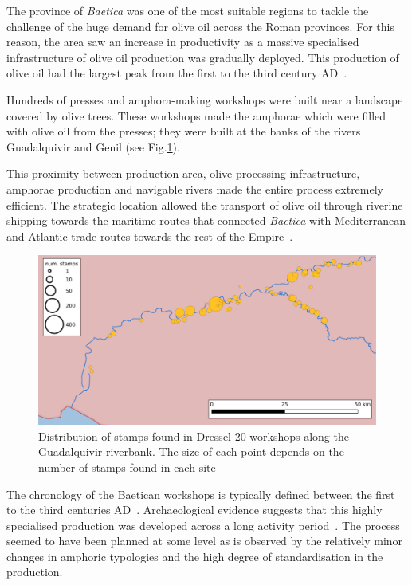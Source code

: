 The province of \textit{Baetica} was one of the most suitable regions to tackle the challenge of the huge demand for olive oil across the Roman provinces. For this reason, the area saw an increase in productivity as a massive specialised infrastructure of olive oil production was gradually deployed. This production of olive oil had the largest peak from the first to the third century AD~\citep{remesal_concierto}. 

Hundreds of presses and amphora-making workshops were built near a landscape covered by olive trees. These workshops made the amphorae which were filled with olive oil from the presses; they were built at the banks of the rivers Guadalquivir and Genil (see Fig.\ref{workshop}).

This proximity between production area, olive processing infrastructure, amphorae production and navigable rivers made the entire process extremely efficient. The strategic location allowed the transport of olive oil through riverine shipping towards the maritime routes that connected \textit{Baetica} with Mediterranean and Atlantic trade routes towards the rest of the Empire~\citep{garcia_vargas_enrique_formal_2010}.

\begin{figure}[htp]
	\centering
\includegraphics[width=\linewidth]{baetica}
\caption{Distribution of stamps found in Dressel 20 workshops along the Guadalquivir riverbank. The size of each point depends on the number of stamps found in each site}

\label{workshop}
\end{figure} 

The chronology of the Baetican workshops is typically defined between the first to the third centuries AD~\citep{millet_anforas_1998,rodriguez_baetican_1998,chic2005comercio}. Archaeological evidence suggests that this highly specialised production was developed across a long activity period~\citep{remesal_anforas_2004}. The process seemed to have been planned at some level as is observed by the relatively minor changes in amphoric typologies and the high degree of standardisation in the production. 

